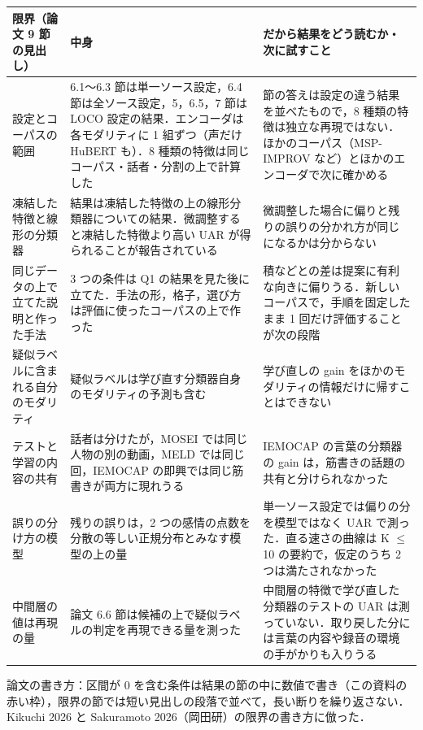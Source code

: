 \documentclass[a4paper,10pt]{ltjsarticle}
\begin{document}
\begin{center}
\small
\begin{tabular}{>{\raggedright}p{3.4cm}>{\raggedright}p{6.5cm}>{\raggedright\arraybackslash}p{6.3cm}}
\toprule
限界（論文 9 節の見出し） & 中身 & だから結果をどう読むか・次に試すこと \\
\midrule
設定とコーパスの範囲 & 6.1〜6.3 節は単一ソース設定，6.4 節は全ソース設定，5，6.5，7 節は LOCO 設定の結果．エンコーダは各モダリティに 1 組ずつ（声だけ HuBERT も）．8 種類の特徴は同じコーパス・話者・分割の上で計算した & 8 節の答えは設定の違う結果を並べたもので，8 種類の特徴は独立な再現ではない．ほかのコーパス（MSP-IMPROV など）とほかのエンコーダで次に確かめる \\
凍結した特徴と線形の分類器 & 結果は凍結した特徴の上の線形分類器についての結果．微調整すると凍結した特徴より高い UAR が得られることが報告されている & 微調整した場合に偏りと残りの誤りの分かれ方が同じになるかは分からない \\
同じデータの上で立てた説明と作った手法 & 3 つの条件は Q1 の結果を見た後に立てた．手法の形，格子，選び方は評価に使ったコーパスの上で作った & 積などとの差は提案に有利な向きに偏りうる．新しいコーパスで，手順を固定したまま 1 回だけ評価することが次の段階 \\
疑似ラベルに含まれる自分のモダリティ & 疑似ラベルは学び直す分類器自身のモダリティの予測も含む & 学び直しの gain をほかのモダリティの情報だけに帰すことはできない \\
テストと学習の内容の共有 & 話者は分けたが，MOSEI では同じ人物の別の動画，MELD では同じ回，IEMOCAP の即興では同じ筋書きが両方に現れうる & IEMOCAP の言葉の分類器の gain は，筋書きの話題の共有と分けられなかった \\
誤りの分け方の模型 & 残りの誤りは，2 つの感情の点数を分散の等しい正規分布とみなす模型の上の量 & 単一ソース設定では偏りの分を模型ではなく UAR で測った．直る速さの曲線は K $\le$ 10 の要約で，仮定のうち 2 つは満たされなかった \\
中間層の値は再現の量 & 論文 6.6 節は候補の上で疑似ラベルの判定を再現できる量を測った & 中間層の特徴で学び直した分類器のテストの UAR は測っていない．取り戻した分には言葉の内容や録音の環境の手がかりも入りうる \\
\bottomrule
\end{tabular}
\end{center}

\noindent 論文の書き方：区間が 0 を含む条件は結果の節の中に数値で書き（この資料の赤い枠），限界の節では短い見出しの段落で並べて，長い断りを繰り返さない．Kikuchi 2026 と Sakuramoto 2026（岡田研）の限界の書き方に倣った．
\end{document}
